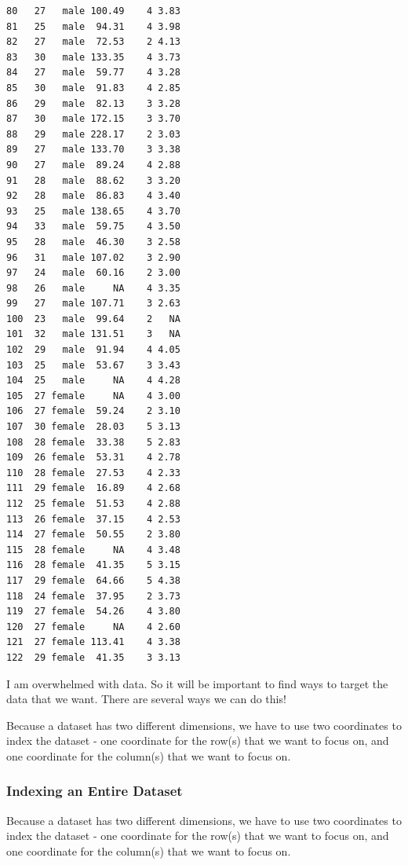 \documentclass[
  letterpaper,
  DIV=11,
  numbers=noendperiod,
  oneside]{scrreprt}
\begin{document}
\begin{verbatim}
80   27   male 100.49    4 3.83
81   25   male  94.31    4 3.98
82   27   male  72.53    2 4.13
83   30   male 133.35    4 3.73
84   27   male  59.77    4 3.28
85   30   male  91.83    4 2.85
86   29   male  82.13    3 3.28
87   30   male 172.15    3 3.70
88   29   male 228.17    2 3.03
89   27   male 133.70    3 3.38
90   27   male  89.24    4 2.88
91   28   male  88.62    3 3.20
92   28   male  86.83    4 3.40
93   25   male 138.65    4 3.70
94   33   male  59.75    4 3.50
95   28   male  46.30    3 2.58
96   31   male 107.02    3 2.90
97   24   male  60.16    2 3.00
98   26   male     NA    4 3.35
99   27   male 107.71    3 2.63
100  23   male  99.64    2   NA
101  32   male 131.51    3   NA
102  29   male  91.94    4 4.05
103  25   male  53.67    3 3.43
104  25   male     NA    4 4.28
105  27 female     NA    4 3.00
106  27 female  59.24    2 3.10
107  30 female  28.03    5 3.13
108  28 female  33.38    5 2.83
109  26 female  53.31    4 2.78
110  28 female  27.53    4 2.33
111  29 female  16.89    4 2.68
112  25 female  51.53    4 2.88
113  26 female  37.15    4 2.53
114  27 female  50.55    2 3.80
115  28 female     NA    4 3.48
116  28 female  41.35    5 3.15
117  29 female  64.66    5 4.38
118  24 female  37.95    2 3.73
119  27 female  54.26    4 3.80
120  27 female     NA    4 2.60
121  27 female 113.41    4 3.38
122  29 female  41.35    3 3.13
\end{verbatim}

I am overwhelmed with data. So it will be important to find ways to
target the data that we want. There are several ways we can do this!

Because a dataset has two different dimensions, we have to use two
coordinates to index the dataset - one coordinate for the row(s) that we
want to focus on, and one coordinate for the column(s) that we want to
focus on.\\

\subsubsection{Indexing an Entire
Dataset}\label{indexing-an-entire-dataset}

Because a dataset has two different dimensions, we have to use two
coordinates to index the dataset - one coordinate for the row(s) that we
want to focus on, and one coordinate for the column(s) that we want to
focus on.
\end{document}

